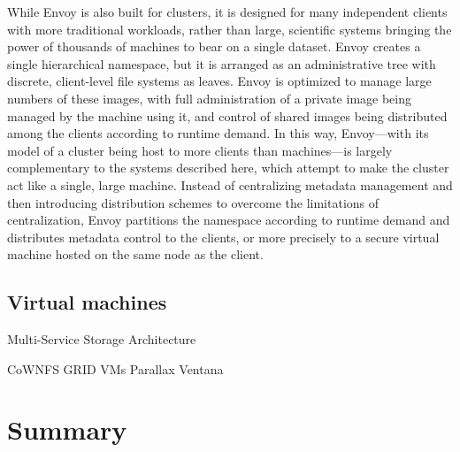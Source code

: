 While Envoy is also built for clusters, it is designed for many independent clients with more traditional workloads, rather than large, scientific systems bringing the power of thousands of machines to bear on a single dataset. Envoy creates a single hierarchical namespace, but it is arranged as an administrative tree with discrete, client-level file systems as leaves. Envoy is optimized to manage large numbers of these images, with full administration of a private image being managed by the machine using it, and control of shared images being distributed among the clients according to runtime demand. In this way, Envoy---with its model of a cluster being host to more clients than machines---is largely complementary to the systems described here, which attempt to make the cluster act like a single, large machine. Instead of centralizing metadata management and then introducing distribution schemes to overcome the limitations of centralization, Envoy partitions the namespace according to runtime demand and distributes metadata control to the clients, or more precisely to a secure virtual machine hosted on the same node as the client.

\subsection{Virtual machines}

Multi-Service Storage Architecture \cite{bacon}

CoWNFS \cite{kotsovinos04b}
GRID VMs \cite{zhao04} \cite{figueiredo01}
Parallax \cite{warfield}
Ventana \cite{pfaff}


\section{Summary}
